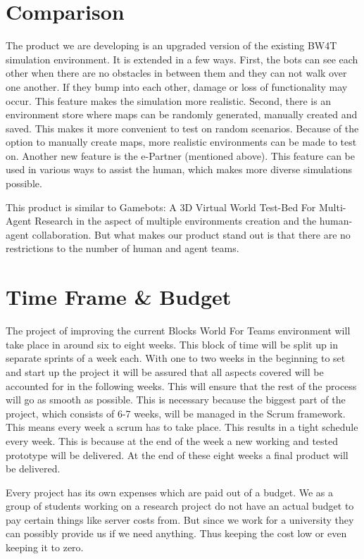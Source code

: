 \documentclass[oneside]{tudelft-report}
\begin{document}
\section{Comparison}
The product we are developing is an upgraded version of the existing BW4T simulation environment. It is extended in a few ways. First, the bots can see each other when there are no obstacles in between them and they can not walk over one another. If they bump into each other, damage or loss of functionality may occur. This feature makes the simulation more realistic. Second, there is an environment store where maps can be randomly generated, manually created and saved. This makes it more convenient to test on random scenarios. Because of the option to manually create maps, more realistic environments can be made to test on. Another new feature is the e-Partner (mentioned above). This feature can be used in various ways to assist the human, which makes more diverse simulations possible.

This product is similar to Gamebots: A 3D Virtual World Test-Bed For Multi-Agent Research \cite{adobbati2001gamebots} in the aspect of multiple environments creation and the human-agent collaboration. But what makes our product stand out is that there are no restrictions to the number of human and agent teams.

\section{Time Frame \& Budget}
The project of improving the current Blocks World For Teams environment will take place in around six to eight weeks. This block of time will be split up in separate sprints of a week each. With one to two weeks in the beginning to set and start up the project it will be assured that all aspects covered will be accounted for in the following weeks. This will ensure that the rest of the process will go as smooth as possible. This is necessary because the biggest part of the project, which consists of 6-7 weeks, will be managed in the Scrum framework. This means every week a scrum has to take place. This results in a tight schedule every week. This is because at the end of the week a new working and tested prototype will be delivered. At the end of these eight weeks a final product will be delivered.

Every project has its own expenses which are paid out of a budget. We as a group of students working on a research project do not have an actual budget to pay certain things like server costs from. But since we work for a university they can possibly provide us if we need anything. Thus keeping the cost low or even keeping it to zero.


\printglossaries


\clearpage


\end{document}
